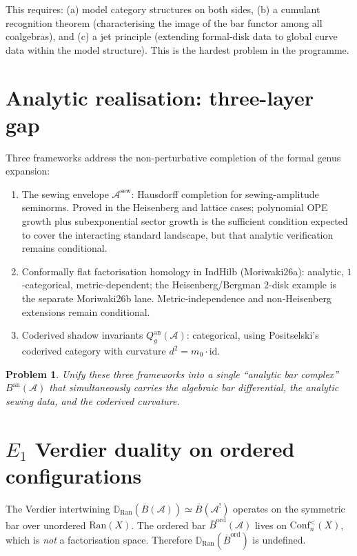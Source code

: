 \documentclass[11pt]{amsart}
\newcommand{\cA}{\mathcal{A}}
\newcommand{\barB}{\overline{B}}
\newcommand{\Ran}{\mathrm{Ran}}
\newcommand{\Conf}{\mathrm{Conf}}
\theoremstyle{plain}
\newtheorem{problem}[theorem]{Problem}
\theoremstyle{definition}
\theoremstyle{remark}
\begin{document}
This requires: (a) model category structures on both sides,
(b) a cumulant recognition theorem (characterising the image of
the bar functor among all coalgebras), and (c) a jet principle
(extending formal-disk data to global curve data within the model
structure). This is the hardest problem in the programme.


\section{Analytic realisation: three-layer gap}

Three frameworks address the non-perturbative completion of the
formal genus expansion:
\begin{enumerate}[label=(\alph*)]
\item The sewing envelope $\cA^{\mathrm{sew}}$: Hausdorff
 completion for sewing-amplitude seminorms. Proved in the
 Heisenberg and lattice cases; polynomial OPE growth plus
 subexponential sector growth is the sufficient condition
 expected to cover the interacting standard landscape, but that
 analytic verification remains conditional.
\item Conformally flat factorisation homology in
 $\mathrm{IndHilb}$ (Moriwaki26a): analytic, $1$-categorical,
 metric-dependent; the Heisenberg/Bergman $2$-disk example is the
 separate Moriwaki26b lane.  Metric-independence and
 non-Heisenberg extensions remain conditional.
\item Coderived shadow invariants $Q_g^{\mathrm{an}}(\cA)$:
 categorical, using Positselski's coderived category with
 curvature $d^2 = m_0 \cdot \mathrm{id}$.
\end{enumerate}

\begin{problem}
Unify these three frameworks into a single ``analytic bar
complex'' $B^{\mathrm{an}}(\cA)$ that simultaneously carries the
algebraic bar differential, the analytic sewing data, and the
coderived curvature.
\end{problem}


\section{$E_1$ Verdier duality on ordered configurations}

The Verdier intertwining $\mathbb{D}_{\Ran}(\barB(\cA))
\simeq \barB(\cA^!)$ operates on the symmetric bar over
unordered $\Ran(X)$. The ordered bar $\barB^{\mathrm{ord}}(\cA)$
lives on $\Conf^<_n(X)$, which is \emph{not} a factorisation
space. Therefore $\mathbb{D}_{\Ran}(\barB^{\mathrm{ord}})$ is
undefined.
\end{document}
